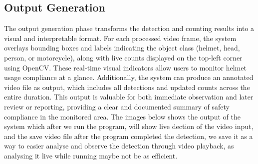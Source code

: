 \subsection{Output Generation}
\noindent\hspace{2.5em}The output generation phase transforms the detection and counting results into a visual and interpretable format. For each processed video frame, the system overlays bounding boxes and labels indicating the object class (helmet, head, person, or motorcycle), along with live counts displayed on the top-left corner using OpenCV. These real-time visual indicators allow users to monitor helmet usage compliance at a glance. Additionally, the system can produce an annotated video file as output, which includes all detections and updated counts across the entire duration. This output is valuable for both immediate observation and later review or reporting, providing a clear and documented summary of safety compliance in the monitored area. The images below shows the output of the system which after we run the program, will show live dection of the video input, and the save video file after the program completed the detection, we save it as a way to easier analyse and observe the detection through video playback, as analysing it live while running maybe not be as efficient.
